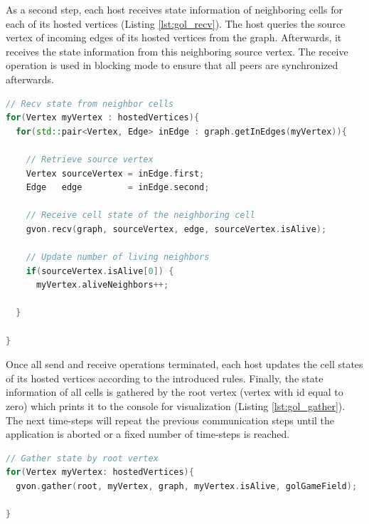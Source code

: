 \noindent As a second step, each host receives state information of
neighboring cells for each of its hosted vertices (Listing
\ref{lst:gol_recv}). The host queries the source vertex of incoming
edges of its hosted vertices from the graph. Afterwards, it receives
the state information from this neighboring source vertex.  The
receive operation is used in blocking mode to ensure that all peers
are synchronized afterwards.

\begin{minipage}[t]{\textwidth} 
\begin{lstlisting}[language=C++, label=lst:gol_recv, caption={A host receives the cell state of neighboring vertices of its hosted vertices. The information of neighboring vertices is retrieved from the graph. The cell states are received in the blocking variant to synchronize the hosts.}]
// Recv state from neighbor cells
for(Vertex myVertex : hostedVertices){
  for(std::pair<Vertex, Edge> inEdge : graph.getInEdges(myVertex)){

    // Retrieve source vertex
    Vertex sourceVertex = inEdge.first;
    Edge   edge         = inEdge.second;

    // Receive cell state of the neighboring cell    
    gvon.recv(graph, sourceVertex, edge, sourceVertex.isAlive);

    // Update number of living neighbors
    if(sourceVertex.isAlive[0]) { 
      myVertex.aliveNeighbors++;

  }

}
\end{lstlisting}
\end{minipage}



\noindent Once all send and receive operations terminated, each host
updates the cell states of its hosted vertices according to the introduced rules. Finally, the
state information of all cells is gathered by the root vertex (vertex
with id equal to zero) which prints it to the console for visualization (Listing
\ref{lst:gol_gather}). The next time-steps will repeat the
previous communication steps until the application is aborted or a
fixed number of time-steps is reached.

\begin{minipage}[t]{\textwidth} 
  \begin{lstlisting}[language=C++, label=lst:gol_gather, caption={The cell states of all vertices of the GoL graph is
    gathered by a host that is responsible for the root vertex. This host could visualize the current state of the GoL domain.}]
// Gather state by root vertex
for(Vertex myVertex: hostedVertices){
  gvon.gather(root, myVertex, graph, myVertex.isAlive, golGameField);

}
\end{lstlisting}
\end{minipage}


